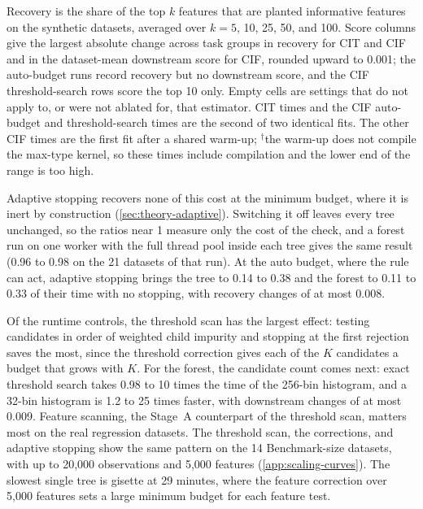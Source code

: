 \begin{table}[tb]
{  Recovery is the share of the top $k$ features that are planted informative
  features on the synthetic datasets, averaged over $k=5$, 10, 25, 50, and 100.
  Score columns give the largest absolute change across task groups in
  recovery for CIT and CIF and in the dataset-mean downstream score for CIF,
  rounded upward to 0.001; the auto-budget runs record recovery but no
  downstream score, and the CIF threshold-search rows score the top 10 only.
  Empty cells are settings that do not apply to, or were not
  ablated for, that estimator. CIT times and the CIF auto-budget and
  threshold-search times are the second of two identical fits. The other CIF
  times are the first fit after a shared warm-up; $^{\dagger}$the warm-up does
  not compile the max-type kernel, so these times include compilation and the
  lower end of the range is too high.}
  \label{tab:runtime-ablations}
\end{table}

Adaptive stopping recovers none of this cost at the minimum budget, where it is
inert by construction (\cref{sec:theory-adaptive}). Switching it off leaves
every tree unchanged, so the ratios near 1 measure only the cost of the check,
and a forest run on one worker with the full thread pool inside each tree gives
the same result (0.96 to 0.98 on the 21 datasets of that run). At the auto budget, where the rule can act, adaptive stopping
brings the tree to 0.14 to 0.38 and the forest to 0.11 to 0.33 of their time
with no stopping, with recovery changes of at most 0.008.

Of the runtime controls, the threshold scan has the largest effect: testing
candidates in order of weighted child impurity and stopping at the first
rejection saves the most, since the threshold correction gives each of the $K$
candidates a budget that grows with $K$. For the forest, the candidate count
comes next: exact threshold search takes 0.98 to 10 times the time of the
256-bin histogram, and a 32-bin histogram is 1.2 to 25 times faster, with
downstream changes of at most 0.009. Feature scanning, the Stage~A
counterpart of the threshold scan, matters most on the real regression
datasets. The threshold scan, the corrections, and adaptive stopping show the
same pattern on the 14 Benchmark-size datasets, with up to 20,000
observations and 5,000 features (\cref{app:scaling-curves}). The slowest single
tree is gisette at 29 minutes, where the feature correction over 5,000 features
sets a large minimum budget for each feature test.
